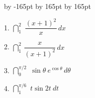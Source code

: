 \documentclass{sebase}
\newenvironment{instructions}{\STARTINSTR}{\ENDINSTR}
\begin{document}
\vspace*{-9pt}%
\setlength{\columnsep}{24pt}
\advance \leftskip by -165pt
\advance\hsize by 165pt
\advance\linewidth by 165pt
\begin{multicols}{2}%

\begin{instructions}
\vspace{-12pt}
\end{instructions}

\begin{instructions}
\end{instructions}

\begin{ExerciseList}
\item[\hfill 1.] $\dint\nolimits_{1}^{2}\,\,\dfrac{(x+1)^{2}}{x}\,dx$

%

\item[\hfill 2.] $\dint\nolimits_{1}^{2}\,\dfrac{x}{(x+1)^{2}}\,dx$

%

\item[\hfill 3.] $\dint\nolimits_{0}^{\pi /2}\,\,\sin \theta ~e^{\cos \theta
}\,d\theta $

%

\item[\hfill 4.] $\dint\nolimits_{1}^{\pi /6}\,\,t\sin 2t~dt$

%


\end{ExerciseList}
\end{multicols}
\end{document}
